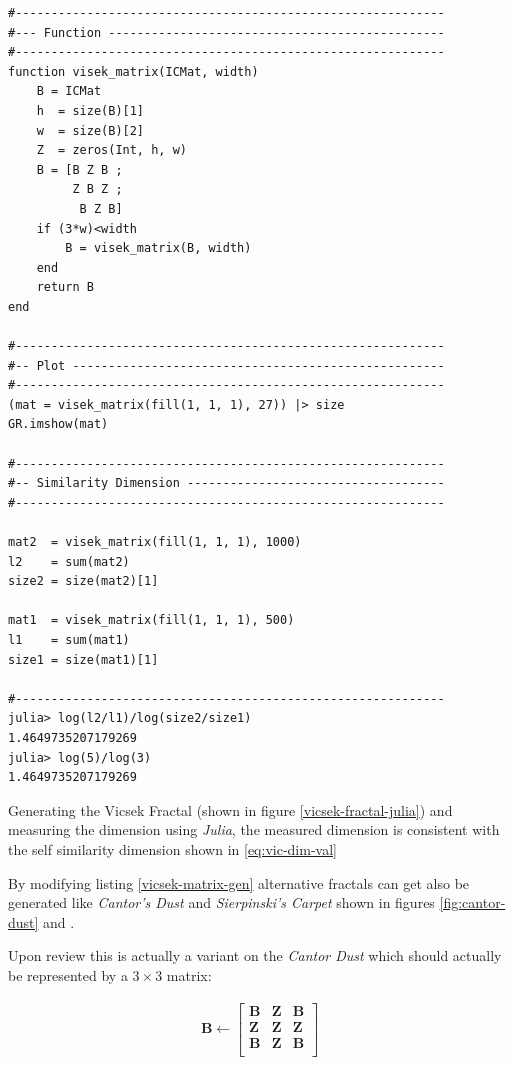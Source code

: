 \documentclass[a4paper,11pt,twoside]{article}
\begin{document}
\begin{listing}[htbp]
\begin{verbatim}
#------------------------------------------------------------
#--- Function -----------------------------------------------
#------------------------------------------------------------
function visek_matrix(ICMat, width)
    B = ICMat
    h  = size(B)[1]
    w  = size(B)[2]
    Z  = zeros(Int, h, w)
    B = [B Z B ;
         Z B Z ;
          B Z B]
    if (3*w)<width
        B = visek_matrix(B, width)
    end
    return B
end

#------------------------------------------------------------
#-- Plot ----------------------------------------------------
#------------------------------------------------------------
(mat = visek_matrix(fill(1, 1, 1), 27)) |> size
GR.imshow(mat)

#------------------------------------------------------------
#-- Similarity Dimension ------------------------------------
#------------------------------------------------------------

mat2  = visek_matrix(fill(1, 1, 1), 1000)
l2    = sum(mat2)
size2 = size(mat2)[1]

mat1  = visek_matrix(fill(1, 1, 1), 500)
l1    = sum(mat1)
size1 = size(mat1)[1]

#------------------------------------------------------------
julia> log(l2/l1)/log(size2/size1)
1.4649735207179269
julia> log(5)/log(3)
1.4649735207179269
\end{verbatim}
\caption{\label{vicsek-matrix-gen}Generating the Vicsek Fractal (shown in figure \ref{vicsek-fractal-julia}) and measuring the dimension using \emph{Julia}, the measured dimension is consistent with the self similarity dimension shown in \eqref{eq:vic-dim-val}}
\end{listing}

By modifying listing \ref{vicsek-matrix-gen} alternative fractals can get also be generated like \emph{Cantor's Dust} and \emph{Sierpinski's Carpet} shown in figures \ref{fig:cantor-dust} and .

Upon review this is actually a variant on the \emph{Cantor Dust} which should
actually be represented by a \(3 \times 3\) matrix:

\begin{align}
 \mathbf{B} \leftarrow
 \begin{bmatrix}
    \mathbf{B} & \mathbf{Z} & \mathbf{B} \\
    \mathbf{Z} & \mathbf{Z} & \mathbf{Z} \\
    \mathbf{B} & \mathbf{Z} & \mathbf{B} \\
\end{bmatrix}
\end{align}
\end{document}

